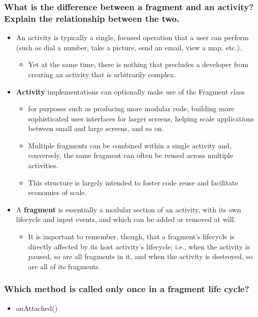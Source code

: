 \documentclass[9pt, b5paper]{article}
\begin{document}
\subsubsection{What is the difference between a fragment and an activity? Explain the relationship between the two.}
\label{sec-1-2-12}
\begin{itemize}
\item An activity is typically a single, focused operation that a user can perform (such as dial a number, take a picture, send an email, view a map, etc.). 
\begin{itemize}
\item Yet at the same time, there is nothing that precludes a developer from creating an activity that is arbitrarily complex.
\end{itemize}
\item \textbf{Activity} implementations can optionally make use of the Fragment class 
\begin{itemize}
\item for purposes such as producing more modular code, building more sophisticated user interfaces for larger screens, helping scale applications between small and large screens, and so on.
\item Multiple fragments can be combined within a single activity and, conversely, the same fragment can often be reused across multiple activities.
\item This structure is largely intended to foster code reuse and facilitate economies of scale.
\end{itemize}
\item A \textbf{fragment} is essentially a modular section of an activity, with its own lifecycle and input events, and which can be added or removed at will. 
\begin{itemize}
\item It is important to remember, though, that a fragment's lifecycle is directly affected by its host activity's lifecycle; i.e., when the activity is paused, so are all fragments in it, and when the activity is destroyed, so are all of its fragments.
\end{itemize}
\end{itemize}
\subsubsection{Which method is called only once in a fragment life cycle?}
\label{sec-1-2-13}
\begin{itemize}
\item onAttached()
\end{itemize}
\end{document}
